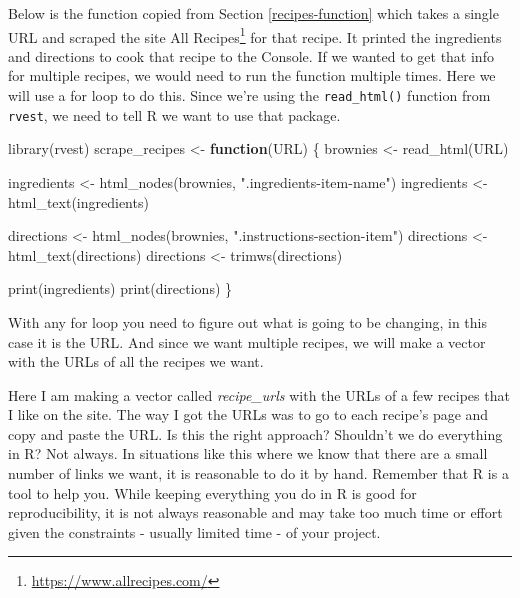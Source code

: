 \documentclass[
]{krantz}
\makeatletter
\newenvironment{Shaded}{\begin{snugshade}}{\end{snugshade}}
\newcommand{\ControlFlowTok}[1]{\textcolor[rgb]{0.27,0.27,0.27}{\textbf{#1}}}
\newcommand{\FunctionTok}[1]{\textcolor[rgb]{0,0,0}{#1}}
\newcommand{\NormalTok}[1]{#1}
\newcommand{\OtherTok}[1]{\textcolor[rgb]{0.37,0.37,0.37}{#1}}
\newcommand{\StringTok}[1]{\textcolor[rgb]{0.5,0.5,0.5}{#1}}
\renewcommand{\href}[2]{#2\footnote{\url{#1}}}
\newenvironment{kframe}{%
\medskip{}
\setlength{\fboxsep}{.8em}
 \def\at@end@of@kframe{}%
 \ifinner\ifhmode%
  \def\at@end@of@kframe{\end{minipage}}%
  \begin{minipage}{\columnwidth}%
 \fi\fi%
 \def\FrameCommand##1{\hskip\@totalleftmargin \hskip-\fboxsep
 \colorbox{shadecolor}{##1}\hskip-\fboxsep
     \hskip-\linewidth \hskip-\@totalleftmargin \hskip\columnwidth}%
 \MakeFramed {\advance\hsize-\width
   \@totalleftmargin\z@ \linewidth\hsize
   \@setminipage}}%
 {\par\unskip\endMakeFramed%
 \at@end@of@kframe}
\renewenvironment{Shaded}{\begin{kframe}}{\end{kframe}}
\makeatother
\begin{document}
Below is the function copied from Section
\ref{recipes-function} which takes a single URL and scraped
the site \href{https://www.allrecipes.com/}{All Recipes} for
that recipe. It printed the ingredients and directions to
cook that recipe to the Console. If we wanted to get that
info for multiple recipes, we would need to run the function
multiple times. Here we will use a for loop to do this.
Since we're using the \texttt{read\_html()} function from
\texttt{rvest}, we need to tell R we want to use that
package.

\begin{Shaded}
\begin{Highlighting}[]
\FunctionTok{library}\NormalTok{(rvest)}
\NormalTok{scrape\_recipes }\OtherTok{\textless{}{-}} \ControlFlowTok{function}\NormalTok{(URL) \{}
\NormalTok{  brownies }\OtherTok{\textless{}{-}} \FunctionTok{read\_html}\NormalTok{(URL)}

\NormalTok{  ingredients }\OtherTok{\textless{}{-}} \FunctionTok{html\_nodes}\NormalTok{(brownies, }\StringTok{".ingredients{-}item{-}name"}\NormalTok{)}
\NormalTok{  ingredients }\OtherTok{\textless{}{-}} \FunctionTok{html\_text}\NormalTok{(ingredients)}

\NormalTok{  directions }\OtherTok{\textless{}{-}} \FunctionTok{html\_nodes}\NormalTok{(brownies, }\StringTok{".instructions{-}section{-}item"}\NormalTok{)}
\NormalTok{  directions }\OtherTok{\textless{}{-}} \FunctionTok{html\_text}\NormalTok{(directions)}
\NormalTok{  directions }\OtherTok{\textless{}{-}} \FunctionTok{trimws}\NormalTok{(directions)}

  \FunctionTok{print}\NormalTok{(ingredients)}
  \FunctionTok{print}\NormalTok{(directions)}
\NormalTok{\}}
\end{Highlighting}
\end{Shaded}

With any for loop you need to figure out what is going to be
changing, in this case it is the URL. And since we want
multiple recipes, we will make a vector with the URLs of all
the recipes we want.

Here I am making a vector called \emph{recipe\_urls} with
the URLs of a few recipes that I like on the site. The way I
got the URLs was to go to each recipe's page and copy and
paste the URL. Is this the right approach? Shouldn't we do
everything in R? Not always. In situations like this where
we know that there are a small number of links we want, it
is reasonable to do it by hand. Remember that R is a tool to
help you. While keeping everything you do in R is good for
reproducibility, it is not always reasonable and may take
too much time or effort given the constraints - usually
limited time - of your project.
\end{document}

